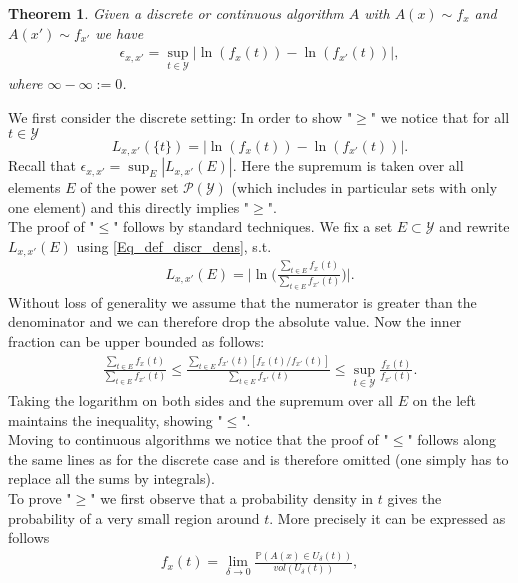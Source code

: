 \documentclass[conference]{IEEEtran}
\newtheorem{theorem}{Theorem}
\begin{document}
\begin{theorem} \label{theorem_local_property}
Given a discrete or continuous algorithm $A$ with $A(x) \sim f_x$ and $A(x') \sim f_{x'}$ we have 
\begin{align} 
\epsilon_{x,x'} = \sup_{t \in \mathcal{Y}} \big| \ln (f_x(t)) - \ln (f_{x'}(t)) \big|, \label{Loss_local}
\end{align}
where $\infty-\infty:= 0$.
\end{theorem}
\begin{IEEEproof} 
We first consider the discrete setting: In order to show "$\ge$" we notice that for all $t \in \mathcal{Y}$ 
$$
L_{x,x'}(\{t\})= \big| \ln (f_x(t)) - \ln (f_{x'}(t)) \big|.
$$
Recall that
$
\epsilon_{x,x'} = \sup_{E} | L_{x,x'}(E)  |.
$
Here the supremum is taken over all elements $E$ of the power set $\mathcal{P}(\mathcal{Y})$ (which includes in particular sets with only one element) and this directly implies "$\ge$".\\
The proof of "$\le$" follows by standard techniques. We fix a set $E \subset \mathcal{Y}$
and rewrite $L_{x,x'}(E)$ using \eqref{Eq_def_discr_dens}, s.t.
\begin{align}
    L_{x,x'}(E)  
= \Big|\ln \Big( \frac{\sum_{t \in E} f_x(t)}{\sum_{t \in E} f_{x'}(t) } \Big)\Big|. \label{sum_quotient}
\end{align}
Without loss of generality we assume that the numerator is greater than the denominator and we can therefore drop the absolute value. Now the inner fraction can be upper bounded as follows:
\begin{align*}
    \frac{\sum_{t \in E} f_x(t)}{\sum_{t \in E} f_{x'}(t) } \le \frac{\sum_{t \in E} f_{x'}(t)[f_x(t)/f_{x'}(t)]}{\sum_{t \in E} f_{x'}(t) } \le \sup_{t \in \mathcal{Y}} \frac{f_{x}(t)}{f_{x'}(t)}.
\end{align*}
Taking the logarithm on both sides and the supremum over all $E$ on the left maintains the inequality, showing "$\le$". \\
Moving to continuous algorithms we notice that the proof of "$\le$" follows along the same lines as for the discrete case and is therefore omitted (one simply has to replace all the sums by integrals). \\
To prove "$\ge$" we first observe that a probability density in $t$ gives the probability of a very small region around $t$. More precisely it can be expressed as follows
\begin{align*} 
    f_x(t) = \lim_{\delta \to 0} \frac{\mathbb{P}(A(x) \in U_\delta(t))}{vol(U_\delta(t))},

\end{align*}
\end{IEEEproof}
\end{document}
